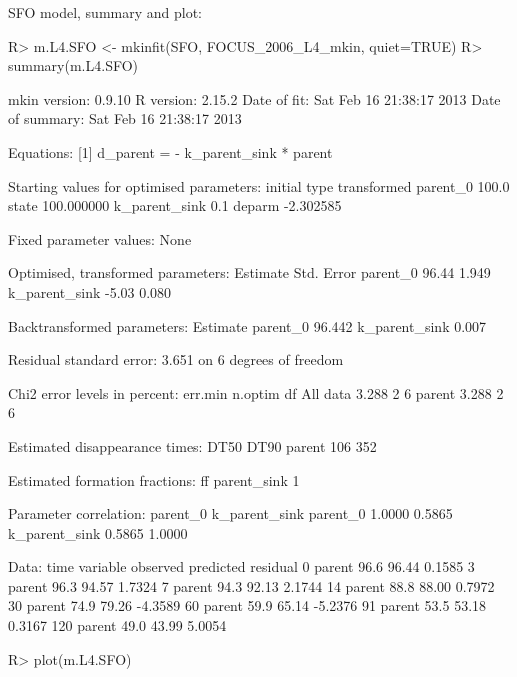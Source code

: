 \documentclass[12pt,a4paper]{article}
\begin{document}
SFO model, summary and plot:

\begin{Schunk}
\begin{Sinput}
R> m.L4.SFO <- mkinfit(SFO, FOCUS_2006_L4_mkin, quiet=TRUE)
R> summary(m.L4.SFO)
\end{Sinput}
\begin{Soutput}
mkin version:    0.9.10 
R version:       2.15.2 
Date of fit:     Sat Feb 16 21:38:17 2013 
Date of summary: Sat Feb 16 21:38:17 2013 

Equations:
[1] d_parent = - k_parent_sink * parent

Starting values for optimised parameters:
              initial   type transformed
parent_0        100.0  state  100.000000
k_parent_sink     0.1 deparm   -2.302585

Fixed parameter values:
None

Optimised, transformed parameters:
              Estimate Std. Error
parent_0         96.44      1.949
k_parent_sink    -5.03      0.080

Backtransformed parameters:
              Estimate
parent_0        96.442
k_parent_sink    0.007

Residual standard error: 3.651 on 6 degrees of freedom

Chi2 error levels in percent:
         err.min n.optim df
All data   3.288       2  6
parent     3.288       2  6

Estimated disappearance times:
       DT50 DT90
parent  106  352

Estimated formation fractions:
            ff
parent_sink  1

Parameter correlation:
              parent_0 k_parent_sink
parent_0        1.0000        0.5865
k_parent_sink   0.5865        1.0000

Data:
 time variable observed predicted residual
    0   parent     96.6     96.44   0.1585
    3   parent     96.3     94.57   1.7324
    7   parent     94.3     92.13   2.1744
   14   parent     88.8     88.00   0.7972
   30   parent     74.9     79.26  -4.3589
   60   parent     59.9     65.14  -5.2376
   91   parent     53.5     53.18   0.3167
  120   parent     49.0     43.99   5.0054
\end{Soutput}
\begin{Sinput}
R> plot(m.L4.SFO)
\end{Sinput}
\end{Schunk}
\end{document}
